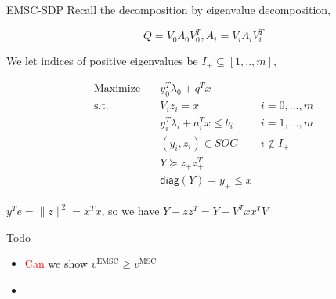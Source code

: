 \begin{frame}{EMSC-SDP}
  Recall the decomposition by eigenvalue decomposition,

  \[Q = V_0\Lambda_0 V_0 ^T, A_i = V_i\Lambda_i V_i^T \]

  We let indices of positive eigenvalues be \(I_+ \subseteq [1, .., m]\),

  \begin{align}
    \nonumber \mathrm{Maximize}\quad & y_0 ^T\lambda_0 + q^Tx                          \\
    \mathrm{s.t.} \quad              & V_i z_i = x                       & i=0,...,m   \\
                                     & y_i ^T\lambda_i + a_i^Tx  \le b_i & i=1,...,m   \\
                                     & (y_i, z_i) \in SOC                & i\notin I_+ \\
                                     & Y \succeq z_+ z_+^T                             \\
                                     & \mathsf{diag}(Y) = y_+ \le x
  \end{align}

  \(y^Te = \|z\|^2 = x^Tx\), so we have \(Y - z z^T = Y - V^Txx^TV \)

\end{frame}

\begin{frame}{Todo}
  \begin{itemize}
    \item \textcolor{red}{Can} we show \(v^{\mathrm{EMSC}} \ge v^{\mathrm{MSC}}\)
    \item
  \end{itemize}
\end{frame}

\begin{frame}
  \printbibliography
\end{frame}

